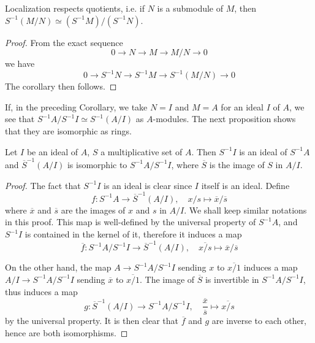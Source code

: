 \begin{lemma}
\label{lemma-localize-quotient-modules}
Localization respects quotients, i.e. if $N$ is a submodule of
$M$, then $S^{-1}(M/N)\simeq (S^{-1}M)/(S^{-1}N)$.
\end{lemma}

\begin{proof}
From the exact sequence
$$
0 \longrightarrow N \longrightarrow M \longrightarrow M/N \longrightarrow 0
$$
we have
$$
0 \longrightarrow S^{-1}N \longrightarrow S^{-1}M
\longrightarrow S^{-1}(M/N) \longrightarrow 0
$$
The corollary then follows.
\end{proof}

\noindent
If, in the preceding Corollary, we take $N = I$ and $M = A$ for an ideal $I$ of
$A$, we see that $S^{-1}A/S^{-1}I \simeq S^{-1}(A/I)$ as $A$-modules. The next
proposition shows that they are isomorphic as rings.

\begin{proposition}
\label{proposition-localize-quotient}
Let $I$ be an ideal of $A$, $S$ a multiplicative set of $A$. Then
$S^{-1}I$ is an ideal of $S^{-1}A$ and $\overline{S}^{-1}(A/I)$ is
isomorphic to $S^{-1}A/S^{-1}I$, where $\overline{S}$ is
the image of $S$ in $A/I$.
\end{proposition}

\begin{proof}
The fact that $S^{-1}I$ is an ideal is clear since $I$ itself is an
ideal. Define
$$
f : S^{-1}A\longrightarrow \overline{S}^{-1}(A/I), \quad x/s\mapsto
\overline{x}/\overline{s}
$$
where $\overline{x}$ and $\overline{s}$ are the images of $x$ and
$s$ in $A/I$. We shall keep similar notations in this proof.
This map is well-defined by the universal property of
$S^{-1}A$, and $S^{-1}I$ is contained in the kernel of it,
therefore it induces a map
$$
\overline{f} : S^{-1}A/S^{-1}I \longrightarrow \overline{S}^{-1}(A/I), \quad
\overline{x/s}\mapsto \overline{x}/\overline{s}
$$

\medskip\noindent
On the other hand, the map $A\rightarrow S^{-1}A/S^{-1}I$ sending $x$ to
$\overline{x/1}$ induces a map $A/I \rightarrow S^{-1}A/S^{-1}I$ sending
$\overline{x}$ to $\overline{x/1}$. The image of $\overline{S}$ is
invertible in $S^{-1}A/S^{-1}I$, thus induces a map
$$
g : \overline{S}^{-1}(A/I) \longrightarrow S^{-1}A/S^{-1}I, \quad
\frac{\overline{x}}{\overline{s}}\mapsto \overline{x/s}
$$
by the universal property. It is then clear that $\overline{f}$ and $g$
are inverse to each other, hence are both isomorphisms.
\end{proof}

